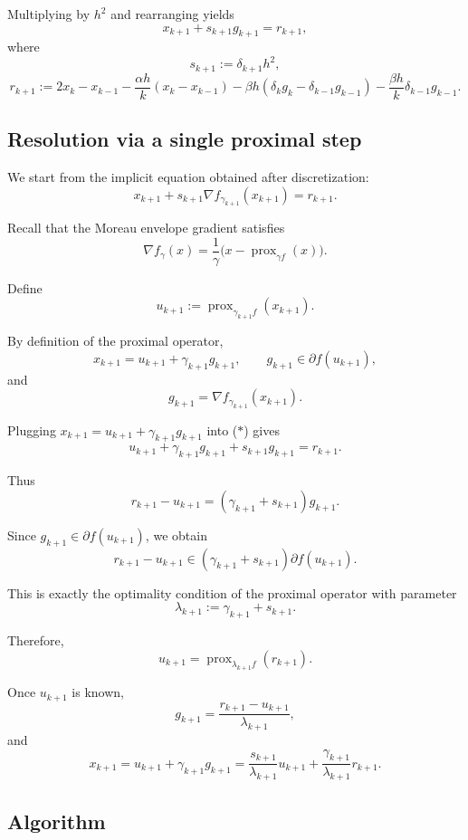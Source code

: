\documentclass[11pt]{article}
\numberwithin{equation}{section}
\begin{document}
Multiplying by $h^2$ and rearranging yields
\begin{equation}
x_{k+1}+s_{k+1}g_{k+1}
=
r_{k+1},
\tag{$\ast$}
\end{equation}
where
\[
s_{k+1}
:=
\delta_{k+1}h^2,
\]
\[
r_{k+1}
:=
2x_k-x_{k-1}
-\frac{\alpha h}{k}(x_k-x_{k-1})
-\beta h(\delta_k g_k-\delta_{k-1}g_{k-1})-\frac{\beta h}{k}\delta_{k-1}g_{k-1}.
\]

\subsection{Resolution via a single proximal step}

We start from the implicit equation obtained after discretization:
\begin{equation}
x_{k+1}
+
s_{k+1}\nabla f_{\gamma_{k+1}}(x_{k+1})
=
r_{k+1}.
\tag{$\ast$}
\end{equation}

Recall that the Moreau envelope gradient satisfies
\[
\nabla f_{\gamma}(x)
=
\frac{1}{\gamma}
\Big(x-\operatorname{prox}_{\gamma f}(x)\Big).
\]

Define
\[
u_{k+1}
:=
\operatorname{prox}_{\gamma_{k+1} f}(x_{k+1}).
\]

By definition of the proximal operator,
\[
x_{k+1}
=
u_{k+1}
+
\gamma_{k+1} g_{k+1},
\qquad
g_{k+1}\in\partial f(u_{k+1}),
\]
and
\[
g_{k+1}
=
\nabla f_{\gamma_{k+1}}(x_{k+1}).
\]

Plugging $x_{k+1}=u_{k+1}+\gamma_{k+1} g_{k+1}$ into ($\ast$) gives
\[
u_{k+1}
+
\gamma_{k+1} g_{k+1}
+
s_{k+1} g_{k+1}
=
r_{k+1}.
\]

Thus
\[
r_{k+1}-u_{k+1}
=
(\gamma_{k+1}+s_{k+1}) g_{k+1}.
\]

Since $g_{k+1}\in\partial f(u_{k+1})$, we obtain
\[
r_{k+1}-u_{k+1}
\in
(\gamma_{k+1}+s_{k+1}) \partial f(u_{k+1}).
\]

This is exactly the optimality condition of the proximal operator with
parameter
\[
\lambda_{k+1}
:=
\gamma_{k+1}+s_{k+1}.
\]

Therefore,
\[
u_{k+1}
=
\operatorname{prox}_{\lambda_{k+1} f}(r_{k+1}).
\]

Once $u_{k+1}$ is known,
\[
g_{k+1}
=
\frac{r_{k+1}-u_{k+1}}{\lambda_{k+1}},
\]
and
\[
x_{k+1}
=
u_{k+1}
+
\gamma_{k+1} g_{k+1}
=
\frac{s_{k+1}}{\lambda_{k+1}}u_{k+1}
+
\frac{\gamma_{k+1}}{\lambda_{k+1}}r_{k+1}.
\]

\medskip

\noindent

\subsection{Algorithm}
\end{document}

